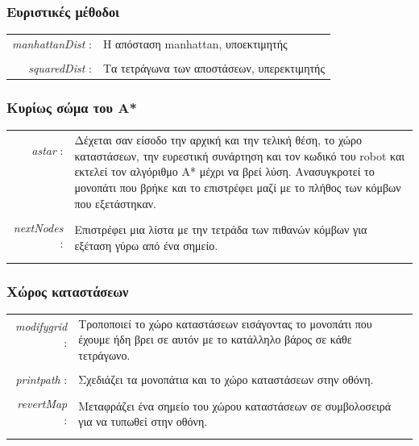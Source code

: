 \documentclass[a4paper,9pt]{article}
\begin{document}
\subsubsection{Eυριστικές μέθοδοι}
\begin{tabular}{r l}
    \emph{manhattanDist} :&Η απόσταση manhattan, υποεκτιμητής\\
    &\\
    \emph{squaredDist} :&Τα τετράγωνα των αποστάσεων, υπερεκτιμητής\\
\end{tabular}
\subsubsection{Κυρίως σώμα του Α*}
\begin{tabular}{r l}
    \emph{astar} :&\multirow{6}{10cm}{Δέχεται σαν είσοδο την αρχική και την τελική θέση, το χώρο
        καταστάσεων, την ευρεστική συνάρτηση και τον κωδικό του robot και εκτελεί
        τον αλγόριθμο Α* μέχρι να βρεί λύση. Ανασυγκροτεί το μονοπάτι που βρήκε
        και το επιστρέφει μαζί με το πλήθος των κόμβων που εξετάστηκαν.}\\
		&\\&\\&\\&\\&\\&\\
    \emph{nextNodes} :&\multirow{2}{10cm}{Επιστρέφει μια λίστα με την τετράδα των πιθανών
        κόμβων για εξέταση γύρω από ένα σημείο.}\\
        &\\&\\
\end{tabular}
\subsubsection{Χώρος καταστάσεων}
\begin{tabular}{r l}
    \emph{modifygrid} :&\multirow{3}{10cm}{Τροποποιεί το χώρο καταστάσεων
        εισάγοντας το μονοπάτι που έχουμε ήδη βρει σε αυτόν με το κατάλληλο βάρος σε
        κάθε τετράγωνο.}\\
        &\\&\\&\\
    \emph{printpath} :&Σχεδιάζει τα μονοπάτια και το χώρο καταστάσεων στην
        οθόνη.\\
        &\\
    \emph{revertMap} :&\multirow{2}{10cm}{Μεταφράζει ένα σημείο του χώρου καταστάσεων σε
        συμβολοσειρά για να τυπωθεί στην οθόνη.}\\
        &\\&\\
\end{tabular}
\end{document}
